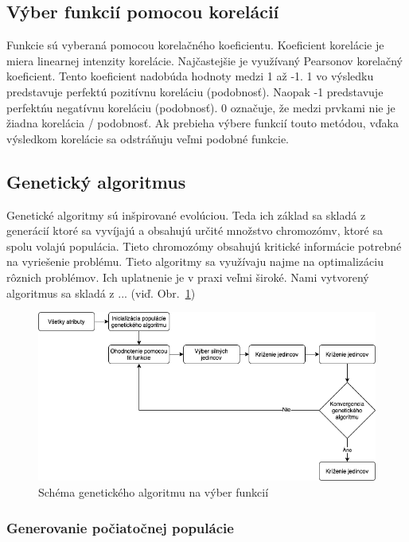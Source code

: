 \documentclass[runningheads]{llncs}
\begin{document}
\subsection{Výber funkcií pomocou korelácií}
Funkcie sú vyberaná pomocou korelačného koeficientu. Koeficient korelácie je miera linearnej intenzity 
korelácie. Najčastejšie je využívaný Pearsonov korelačný koeficient. Tento koeficient nadobúda hodnoty medzi
1 až -1. 1 vo výsledku predstavuje perfektú pozitívnu koreláciu (podobnosť). Naopak -1 predstavuje 
perfektńu negatívnu koreláciu (podobnosť). 0 označuje, že medzi prvkami nie je žiadna korelácia / podobnosť.
Ak prebieha výbere funkcií touto metódou, vďaka výsledkom korelácie sa odstráňuju veľmi podobné funkcie.\cite{ref_xu}

\subsection{Genetický algoritmus}

Genetické algoritmy sú inšpirované evolúciou. Teda ich základ sa skladá z generácií ktoré sa vyvíjajú a obsahujú 
určité množstvo chromozómv, ktoré sa spolu volajú populácia. Tieto chromozómy obsahujú kritické informácie 
potrebné na vyriešenie problému. Tieto algoritmy sa využívaju najme na optimalizáciu rôznich
problémov. Ich uplatnenie je v praxi veľmi široké.\cite{ref_babatunde,ref_whitley} Nami vytvorený algoritmus 
sa skladá z ... (viď. Obr.~\ref{fig_ga_rozdelenie})

\begin{figure}
\includegraphics[width=\textwidth]{image/GA_alg.png}
\caption{Schéma genetického algoritmu na výber funkcií} \label{fig_ga_rozdelenie}
\end{figure}

\subsubsection{Generovanie počiatočnej populácie}
\end{document}
